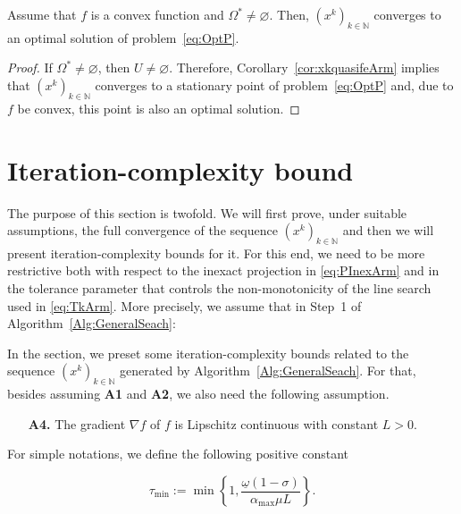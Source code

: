 \begin{theorem}
	Assume that $f$ is a convex function and  $\Omega^* \neq \varnothing$. Then,   $(x^k)_{k\in\mathbb{N}}$ converges to an optimal solution of problem~\eqref{eq:OptP}.
\end{theorem}
\begin{proof}
	If $\Omega^* \neq \varnothing$, then   $U \neq \varnothing$.   Therefore,  Corollary~\ref{cor:xkquasifeArm} implies  that $(x^k)_{k\in\mathbb{N}}$ converges to a stationary point of  problem~\eqref{eq:OptP} and,  due to  $f$ be   convex, this point  is also an optimal solution.
\end{proof}


\section{Iteration-complexity bound}\label{SubSec:IterCompArm}

The purpose of this section is twofold.  We will first prove, under suitable assumptions, the full convergence of the  sequence $(x^k)_{k\in\mathbb{N}}$  and then we will present  iteration-complexity bounds for it.   For this end,  we need to be more restrictive both with respect to the inexact projection in \eqref{eq:PInexArm} and in the tolerance parameter that controls the non-monotonicity of the line search used in \eqref{eq:TkArm}. More precisely,  we   assume  that in Step~1  of  Algorithm~\ref{Alg:GeneralSeach}:



In the section, we preset some  iteration-complexity bounds related to  the sequence $(x^k)_{k\in\mathbb{N}}$ generated by  Algorithm~\ref{Alg:GeneralSeach}.  For that, besides  assuming  {\bf A1} and {\bf A2},  we also need the following assumption.
\begin{itemize}
	\item[{\bf A4.}] The  gradient $\nabla f$ of $f$ is  Lipschitz continuous with constant $L>0$.
\end{itemize}
For simple notations, we define the  following positive constant



\begin{equation} \label{eq;taumin}
	\tau_{\min} := \min \left\{1, \frac{\underline\omega(1-\sigma)}{{\alpha_{\max}}\mu L}\right\}.
\end{equation}


